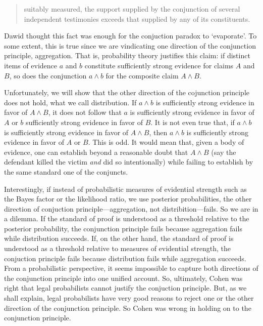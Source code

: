 \documentclass[10pt,dvipsnames,enabledeprecatedfontcommands]{scrartcl}
\begin{document}
\begin{quote} suitably measured, the support  supplied by the conjunction of several independent testimonies exceeds that supplied by any of its constituents.
 \end{quote}

\noindent Dawid thought this fact was enough for the conjuction paradox
to `evaporate'. To some extent, this is true since we are vindicating
one direction of the conjunction principle, aggregation. That is,
probability theory justifies this claim: if distinct items of evidence
\(a\) and \(b\) constitute sufficiently strong evidence for claims \(A\)
and \(B\), so does the conjunction \(a\wedge b\) for the composite claim
\(A\wedge B\).

Unfortunately, we will show that the other direction of the cojunction
principle does not hold, what we call distribution. If \(a \wedge b\) is
sufficiently strong evidence in favor of \(A \wedge B\), it does not
follow that \(a\) is sufficiently strong evidence in favor of \(A\) or
\(b\) sufficiently strong evidence in favor of \(B\). It is not even
true that, if \(a \wedge b\) is sufficiently strong evidence in favor of
\(A \wedge B\), then \(a\wedge b\) is sufficiently strong evidence in
favor of \(A\) or \(B\). This is odd. It would mean that, given a body
of evidence, one can establish beyond a reasonable doubt that
\(A \wedge B\) (say the defendant killed the victim \textit{and} did so
intentionally) while failing to establish by the same standard one of
the conjuncts.

Interestingly, if instead of probabilistic measures of evidential
strength such as the Bayes factor or the likelihood ratio, we use
posterior probabilities, the other direction of conjuction
principle---aggregation, not distribition---fails. So we are in a
dilemma. If the standard of proof is understood as a threshold relative
to the posterior probability, the conjunction principle fails because
aggregation fails while distribution succeeds. If, on the other hand,
the standard of proof is understood as a threshold relative to measures
of evidential strength, the conjuction principle fails because
distribution fails while aggregation succeeds. From a probabilistic
perspective, it seems impossible to capture both directions of the
conjunction principle into one unified account. So, ultimately, Cohen
was right that legal probabilists cannot justify the conjuction
principle. But, as we shall explain, legal probabilists have very good
reasons to reject one or the other direction of the conjunction
principle. So Cohen was wrong in holding on to the conjunction
principle.
\end{document}
